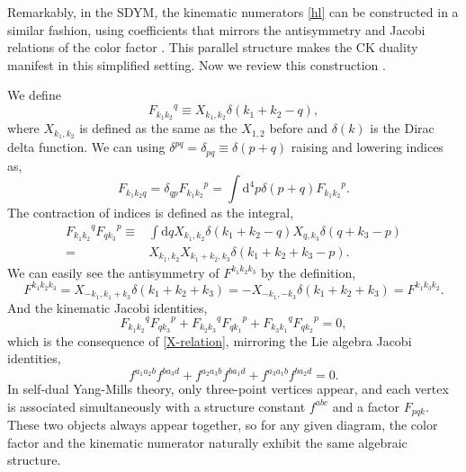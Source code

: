 \documentclass[a4paper,11pt]{article}
\begin{document}
Remarkably, in the SDYM, the kinematic numerators \eqref{hl} can be constructed in a similar fashion, using coefficients that mirrors the antisymmetry and Jacobi relations of the color factor \cite{Monteiro:2011pc}.
This parallel structure makes the CK duality manifest in this simplified setting. Now we review this construction \cite{Monteiro:2011pc}.\par
We define
\begin{equation}
    {F_{k_1k_2}}^{q}\equiv X_{k_1,k_2}\delta(k_1+k_2-q),
\end{equation}
where $X_{k_1,k_2}$ is defined as the same as the $X_{1,2}$ before and $\delta(k)$ is the Dirac delta function. 
We can using $\delta^{pq}=\delta_{pq}\equiv\delta(p+q)$ raising and lowering indices as,
\begin{equation}
    {F_{k_1k_2q}}=\delta_{qp}{F_{k_1k_2}}^{p}=\int\mathrm{d}^4p \delta(p+q){F_{k_1k_2}}^{p}.
\end{equation}
The contraction of indices is defined as the integral,
\begin{equation}\label{F-contr}
    \begin{split}
        {F_{k_1k_2}}^q {F_{q k_3}}^{p}\equiv& \int \mathrm{d}q X_{k_1,k_2}\delta(k_1+k_2-q)X_{q,k_3}\delta(q+k_3-p)\\
    =&X_{k_1,k_2}X_{k_1+k_2,k_3}\delta(k_1+k_2+k_3-p).
    \end{split}
\end{equation}
We can easily see the antisymmetry of $F^{k_1 k_2 k_3}$ by the definition,
\begin{equation}
    F^{k_1 k_2 k_3}=X_{-k_1,k_1+k_3}\delta(k_1+k_2+k_3)=-X_{-k_1,-k_3}\delta(k_1+k_2+k_3)=F^{k_1k_3k_2}.
\end{equation} 
And the kinematic Jacobi identities,
\begin{equation}
    {F_{k_1 k_2}}^q{F_{qk_3}}^{p}+{F_{k_2 k_3}}^q{F_{qk_1}}^{p}+{F_{k_3 k_1}}^q{F_{qk_2}}^{p}=0,
\end{equation}
which is the consequence of \eqref{X-relation}, mirroring the Lie algebra Jacobi identities,
\begin{equation}
    f^{a_1a_2b}f^{ba_3d}+f^{a_2a_3b}f^{ba_1d}+f^{a_3a_1b}f^{ba_2d}=0.
\end{equation}
In self-dual Yang-Mills theory, only three-point vertices appear, and each vertex is associated simultaneously with a structure constant $f^{abc}$ and a factor $F_{pqk}$. 
These two objects always appear together, so for any given diagram, the color factor and the kinematic numerator naturally exhibit the same algebraic structure. 
\end{document}
